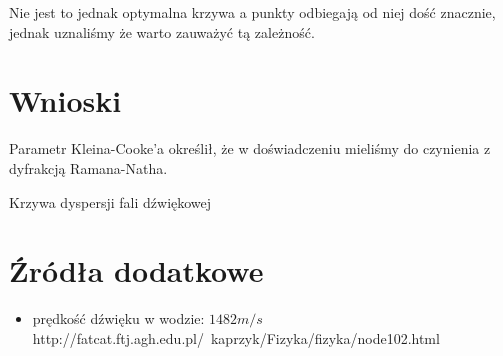 \documentclass[a4paper,12pt]{article}
\begin{document}
Nie jest to jednak optymalna krzywa a punkty odbiegają od niej dość znacznie, jednak uznaliśmy że warto zauważyć tą zależność. 

\section{Wnioski}


Parametr Kleina-Cooke'a określił, że w doświadczeniu mieliśmy do czynienia z dyfrakcją Ramana-Natha. 

Krzywa dyspersji fali dźwiękowej 

\section {Źródła dodatkowe}
  
 \begin{itemize}
   \item prędkość dźwięku w wodzie: $ 1482 m/s$ \\ http://fatcat.ftj.agh.edu.pl/~kaprzyk/Fizyka/fizyka/node102.html
   
 \end{itemize}
\end{document}
